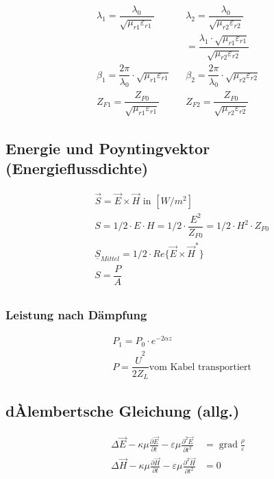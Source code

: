 \begin{align*}
    \lambda_1 = \dfrac{\lambda_0}{\sqrt{\mu_{r1}\varepsilon_{r1}}}        &  & \lambda_2 = \dfrac{\lambda_0}{\sqrt{\mu_{r2}\varepsilon_{r2}}}                           \\
                                                                          &  & = \dfrac{\lambda_1\cdot\sqrt{\mu_{r1}\varepsilon_{r1}}}{\sqrt{\mu_{r2}\varepsilon_{r2}}} \\
    \beta_1 = \dfrac{2\pi}{\lambda_0}\cdot\sqrt{\mu_{r1}\varepsilon_{r1}} &  & \beta_2 = \dfrac{2\pi}{\lambda_0}\cdot\sqrt{\mu_{r2}\varepsilon_{r2}}                    \\
    Z_{F1} = \dfrac{Z_{F0}}{\sqrt{\mu_{r1}\varepsilon_{r1}}}              &  & Z_{F2} = \dfrac{Z_{F0}}{\sqrt{\mu_{r2}\varepsilon_{r2}}}
\end{align*}
\subsection{Energie und Poyntingvektor (Energieflussdichte)}
\begin{align*}
     & \vec{S} = \vec{E}\times\vec{H} \text{ in } [W/m^2]                                   \\
     & S = 1/2 \cdot E \cdot H = 1/2 \cdot \dfrac{E^2}{Z_{F0}} = 1/2 \cdot H^2 \cdot Z_{F0} \\
     & \underline{S}_{Mittel} = 1/2 \cdot Re\{\vec{E}\times\vec{H}^*\}                      \\
     & S = \dfrac{P}{A}                                                                     \\
\end{align*}
\subsubsection{Leistung nach Dämpfung}
\begin{align*}
     & P_1 = P_0 \cdot e^{-2\alpha z}                              \\
     & P = \dfrac{\hat{U}^2}{2 Z_L} \text{vom Kabel transportiert}
\end{align*}
\subsection{dÀlembertsche Gleichung (allg.)}

\begin{align*}
    \Delta \vec{E}-\kappa \mu \frac{\partial \vec{E}}{\partial t}-\varepsilon \mu \frac{\partial^{2} \vec{E}}{\partial t^{2}} & = \operatorname{grad} \frac{\rho}{\varepsilon} \\
    \Delta \vec{H}-\kappa \mu \frac{\partial \vec{H}}{\partial t}-\varepsilon \mu \frac{\partial^{2} \vec{H}}{\partial t^{2}} & = 0
\end{align*}

